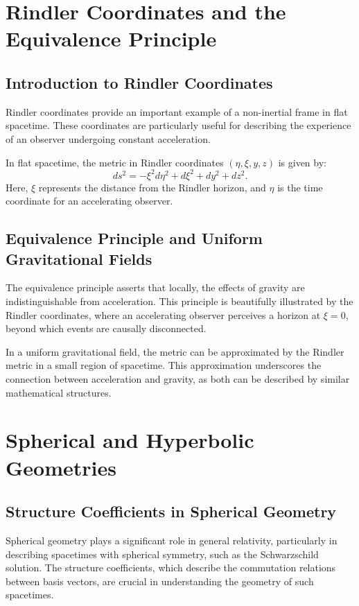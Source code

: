 \documentclass[12pt]{article}
\begin{document}
\section{Rindler Coordinates and the Equivalence Principle}
\subsection{Introduction to Rindler Coordinates}
Rindler coordinates provide an important example of a non-inertial frame in flat spacetime. These coordinates are particularly useful for describing the experience of an observer undergoing constant acceleration.

In flat spacetime, the metric in Rindler coordinates \( (\eta, \xi, y, z) \) is given by:
\begin{equation}
ds^2 = -\xi^2 d\eta^2 + d\xi^2 + dy^2 + dz^2.
\end{equation}
Here, \( \xi \) represents the distance from the Rindler horizon, and \( \eta \) is the time coordinate for an accelerating observer.

\subsection{Equivalence Principle and Uniform Gravitational Fields}
The equivalence principle asserts that locally, the effects of gravity are indistinguishable from acceleration. This principle is beautifully illustrated by the Rindler coordinates, where an accelerating observer perceives a horizon at \( \xi = 0 \), beyond which events are causally disconnected.

In a uniform gravitational field, the metric can be approximated by the Rindler metric in a small region of spacetime. This approximation underscores the connection between acceleration and gravity, as both can be described by similar mathematical structures.

\section{Spherical and Hyperbolic Geometries}
\subsection{Structure Coefficients in Spherical Geometry}
Spherical geometry plays a significant role in general relativity, particularly in describing spacetimes with spherical symmetry, such as the Schwarzschild solution. The structure coefficients, which describe the commutation relations between basis vectors, are crucial in understanding the geometry of such spacetimes.
\end{document}
